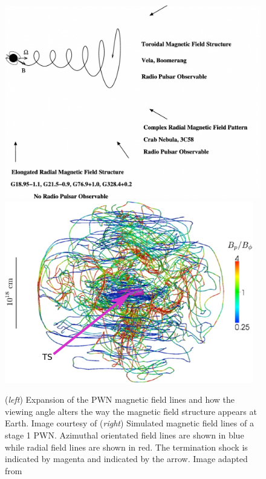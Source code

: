 \begin{figure}[h!]
	\centering
    \includegraphics[height=0.22\textheight]{04_Introduction/Images/pulsar_wind_nebula/magnetic_field_structure.pdf}
	\includegraphics[height=0.22\textheight]{04_Introduction/Images/pulsar_wind_nebula/PWN_magnetic_field_structure.jpeg}
	\caption{(\textit{left}) Expansion of the PWN magnetic field lines and how the viewing angle alters the way the magnetic field structure appears at Earth. Image courtesy of \cite{2006ApJ...638..225K} (\textit{right}) Simulated magnetic field lines of a stage 1 PWN. Azimuthal orientated field lines are shown in blue while radial field lines are shown in red. The termination shock is indicated by magenta and indicated by the arrow. Image adapted from \cite{2014MNRAS.438..278P}}
	\label{fig:chapter1_magnetic_field_structure_PWN}
\end{figure}

